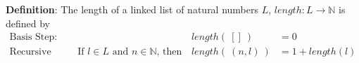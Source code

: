 \documentclass[12pt, oneside]{article}
\begin{document}
\begin{flushright}
\end{flushright}{\bf Definition}: The length of a linked list of natural numbers $L$, $length: L \to \mathbb{N}$ is defined by
\[
\begin{array}{llll}
\textrm{Basis Step:} &  & length(~[]~) &= 0 \\
\textrm{Recursive Step:} & \textrm{If } l \in L\textrm{ and }n \in \mathbb{N}\textrm{, then  } & length(~(n, l)~)  &= 1+ length(l)
\end{array}
\]
\end{document}
